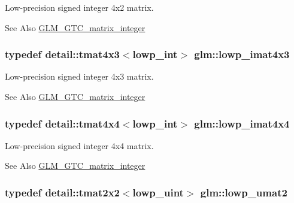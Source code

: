 Low-\/precision signed integer 4x2 matrix. 

\begin{DoxySeeAlso}{See Also}
\hyperlink{group__gtc__matrix__integer}{G\-L\-M\-\_\-\-G\-T\-C\-\_\-matrix\-\_\-integer} 
\end{DoxySeeAlso}
\hypertarget{group__gtc__matrix__integer_gaae7774306f7549793307afb385738163}{
\subsubsection[{lowp\-\_\-imat4x3}]{\setlength{\rightskip}{0pt plus 5cm}typedef detail\-::tmat4x3$<$lowp\-\_\-int$>$ {\bf glm\-::lowp\-\_\-imat4x3}}}\label{group__gtc__matrix__integer_gaae7774306f7549793307afb385738163}


Low-\/precision signed integer 4x3 matrix. 

\begin{DoxySeeAlso}{See Also}
\hyperlink{group__gtc__matrix__integer}{G\-L\-M\-\_\-\-G\-T\-C\-\_\-matrix\-\_\-integer} 
\end{DoxySeeAlso}
\hypertarget{group__gtc__matrix__integer_gaac17bd47c20d89a75d933f21e79e3411}{
\subsubsection[{lowp\-\_\-imat4x4}]{\setlength{\rightskip}{0pt plus 5cm}typedef detail\-::tmat4x4$<$lowp\-\_\-int$>$ {\bf glm\-::lowp\-\_\-imat4x4}}}\label{group__gtc__matrix__integer_gaac17bd47c20d89a75d933f21e79e3411}


Low-\/precision signed integer 4x4 matrix. 

\begin{DoxySeeAlso}{See Also}
\hyperlink{group__gtc__matrix__integer}{G\-L\-M\-\_\-\-G\-T\-C\-\_\-matrix\-\_\-integer} 
\end{DoxySeeAlso}
\hypertarget{group__gtc__matrix__integer_ga8af5e120231c533b017123546642ef18}{
\subsubsection[{lowp\-\_\-umat2}]{\setlength{\rightskip}{0pt plus 5cm}typedef detail\-::tmat2x2$<$lowp\-\_\-uint$>$ {\bf glm\-::lowp\-\_\-umat2}}}\label{group__gtc__matrix__integer_ga8af5e120231c533b017123546642ef18}


